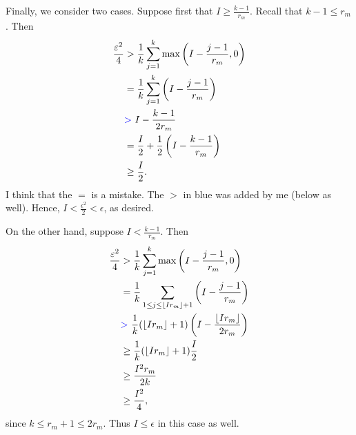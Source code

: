 \documentclass{Vorlesungstemplate_English} %
\begin{document}
\begin{pf}
  Finally, we consider two cases. Suppose first that $I\geq \frac{k-1}{r_m}$. Recall that $k-1\leq r_m$. Then
  \begin{align*}
    \frac{\epsilon^2}{4}
    &> \frac{1}{k}\sum_{j=1}^k\max\left(I-\frac{j-1}{r_m},0\right) \\
    &= \frac{1}{k}\sum_{j=1}^k\left(I-\frac{j-1}{r_m}\right) \\
    &{\color{blue} >} \ I-\frac{k-1}{2r_m} \\
    &= \frac I2+\frac12\left(I-\frac{k-1}{r_m}\right) \\
    &\geq \frac I2.
  \end{align*}
  {\color{blue} I think that the $=$ is a mistake. The $>$ in blue was added by me (below as well).}
  Hence, $I<\frac{\epsilon^2}{2}<\epsilon$, as desired.

  On the other hand, suppose $I<\frac{k-1}{r_m}$. Then
  \begin{align*}
    \frac{\epsilon^2}{4}
    &> \frac{1}{k}\sum_{j=1}^k\max\left(I-\frac{j-1}{r_m},0\right) \\
    &= \frac{1}{k}\sum_{1 \leq j \leq \lfloor Ir_m\rfloor+1}\left(I-\frac{j-1}{r_m}\right) \\
    &{\color{blue} >} \ \frac{1}{k}(\lfloor Ir_m\rfloor+1)\left(I-\frac{\lfloor Ir_m\rfloor}{2r_m}\right) \\
    &\geq \frac{1}{k}(\lfloor Ir_m\rfloor+1)\frac I2 \\
    &\geq \frac{I^2r_m}{2k} \\
    &\geq \frac{I^2}{4},
  \end{align*}
  since $k\leq r_m+1\leq 2r_m$. Thus $I\leq \epsilon$ in this case as well.
\end{pf}
\renewcommand{\currentLectureDate}{3rd July 2026 - \href{https://ecampus.uni-bonn.de/ilias.php?baseClass=ilrepositorygui&cmd=sendfile&ref_id=4206395}{W11L2}}
\end{document}
